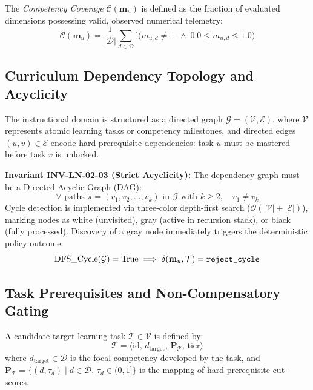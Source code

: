 \documentclass[11pt,a4paper]{article}
\begin{document}
The \textit{Competency Coverage} $\mathcal{C}(\mathbf{m}_u)$ is defined as the fraction of evaluated dimensions possessing valid, observed numerical telemetry:
\begin{equation}
    \mathcal{C}(\mathbf{m}_u) = \frac{1}{|\mathcal{D}|} \sum_{d \in \mathcal{D}} \mathbb{I}\big(m_{u, d} \neq \bot \;\wedge\; 0.0 \le m_{u, d} \le 1.0\big)
\end{equation}

\subsection{Curriculum Dependency Topology and Acyclicity}

The instructional domain is structured as a directed graph $\mathcal{G} = (\mathcal{V}, \mathcal{E})$, where $\mathcal{V}$ represents atomic learning tasks or competency milestones, and directed edges $(u, v) \in \mathcal{E}$ encode hard prerequisite dependencies: task $u$ must be mastered before task $v$ is unlocked.

\textbf{Invariant INV-LN-02-03 (Strict Acyclicity):}
The dependency graph must be a Directed Acyclic Graph (DAG):
\begin{equation}
    \forall \text{ paths } \pi = (v_1, v_2, \dots, v_k) \text{ in } \mathcal{G} \text{ with } k \ge 2,\quad v_1 \neq v_k
\end{equation}
Cycle detection is implemented via three-color depth-first search ($\mathcal{O}(|\mathcal{V}| + |\mathcal{E}|)$), marking nodes as white (unvisited), gray (active in recursion stack), or black (fully processed). Discovery of a gray node immediately triggers the deterministic policy outcome:
\begin{equation}
    \text{DFS\_Cycle}(\mathcal{G}) = \text{True} \implies \delta(\mathbf{m}_u, \mathcal{T}) = \text{\texttt{reject\_cycle}}
\end{equation}

\subsection{Task Prerequisites and Non-Compensatory Gating}

A candidate target learning task $\mathcal{T} \in \mathcal{V}$ is defined by:
\begin{equation}
    \mathcal{T} = \big\langle \text{id},\, d_{\text{target}},\, \mathbf{P}_{\mathcal{T}},\, \text{tier} \big\rangle
\end{equation}
where $d_{\text{target}} \in \mathcal{D}$ is the focal competency developed by the task, and $\mathbf{P}_{\mathcal{T}} = \{ (d, \tau_d) \mid d \in \mathcal{D},\, \tau_d \in (0, 1] \}$ is the mapping of hard prerequisite cut-scores.
\end{document}
